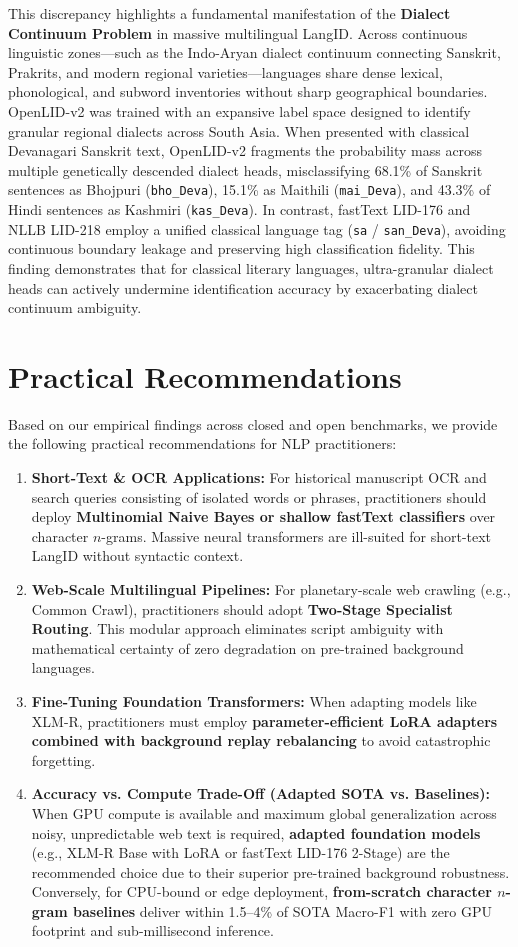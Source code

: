 \documentclass[11pt]{article}
\begin{document}
This discrepancy highlights a fundamental manifestation of the \textbf{Dialect Continuum Problem} in massive multilingual LangID. Across continuous linguistic zones—such as the Indo-Aryan dialect continuum connecting Sanskrit, Prakrits, and modern regional varieties—languages share dense lexical, phonological, and subword inventories without sharp geographical boundaries. OpenLID-v2 was trained with an expansive label space designed to identify granular regional dialects across South Asia. When presented with classical Devanagari Sanskrit text, OpenLID-v2 fragments the probability mass across multiple genetically descended dialect heads, misclassifying 68.1\% of Sanskrit sentences as Bhojpuri (\texttt{bho\_Deva}), 15.1\% as Maithili (\texttt{mai\_Deva}), and 43.3\% of Hindi sentences as Kashmiri (\texttt{kas\_Deva}). In contrast, fastText LID-176 and NLLB LID-218 employ a unified classical language tag (\texttt{sa} / \texttt{san\_Deva}), avoiding continuous boundary leakage and preserving high classification fidelity. This finding demonstrates that for classical literary languages, ultra-granular dialect heads can actively undermine identification accuracy by exacerbating dialect continuum ambiguity.

\section{Practical Recommendations}
Based on our empirical findings across closed and open benchmarks, we provide the following practical recommendations for NLP practitioners:
\begin{enumerate}
    \item \textbf{Short-Text \& OCR Applications:} For historical manuscript OCR and search queries consisting of isolated words or phrases, practitioners should deploy \textbf{Multinomial Naive Bayes or shallow fastText classifiers} over character $n$-grams. Massive neural transformers are ill-suited for short-text LangID without syntactic context.
    \item \textbf{Web-Scale Multilingual Pipelines:} For planetary-scale web crawling (e.g., Common Crawl), practitioners should adopt \textbf{Two-Stage Specialist Routing}. This modular approach eliminates script ambiguity with mathematical certainty of zero degradation on pre-trained background languages.
    \item \textbf{Fine-Tuning Foundation Transformers:} When adapting models like XLM-R, practitioners must employ \textbf{parameter-efficient LoRA adapters combined with background replay rebalancing} to avoid catastrophic forgetting.
    \item \textbf{Accuracy vs. Compute Trade-Off (Adapted SOTA vs. Baselines):} When GPU compute is available and maximum global generalization across noisy, unpredictable web text is required, \textbf{adapted foundation models} (e.g., XLM-R Base with LoRA or fastText LID-176 2-Stage) are the recommended choice due to their superior pre-trained background robustness. Conversely, for CPU-bound or edge deployment, \textbf{from-scratch character $n$-gram baselines} deliver within 1.5--4\% of SOTA Macro-F1 with zero GPU footprint and sub-millisecond inference.
\end{enumerate}
\end{document}
